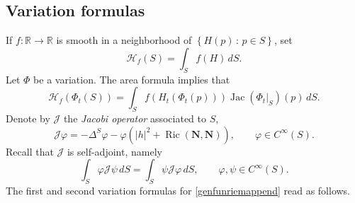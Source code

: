 \documentclass[11pt]{amsart}
\newcommand{\n}[1]{\nabla^\varepsilon_{ #1 }}
\newcommand{\tmc}{{\mathscr{H}}}
\newcommand{\rr}{{\mathbb{R}}}
\newcommand{\X}{\mathbf{X}}
\newcommand{\Z}{\mathbf{Z}}
\renewcommand{\n}{\mathbf{N}}
\DeclareMathOperator{\ric}{Ric}
\newcommand{\jacobi}{\mathcal{J}}
\DeclareMathOperator{\jac}{Jac}
\theoremstyle{definition}
\theoremstyle{remark}
\numberwithin{equation}{section}
\begin{document}
\subsection{Variation formulas}
 If 
$f:\rr\to\rr$ is smooth in a neighborhood of $\left\{H(p)\,:\,p\in S\right\}$, set
\begin{equation}\label{genfunriemappend}
    \tmc_f(S)=\int_S f(H)\,dS.
\end{equation}
Let $\Phi$ be a variation. The area formula implies that 
\begin{equation}\label{areaformulaapplicata}
     \tmc_f\left(\Phi_t(S)\right)=\int_S f\left(H_t\left(\Phi_t(p)\right)\right)\jac\left(\Phi_t|_{S}\right)\left(p\right)\,dS.
\end{equation}
Denote by $\jacobi$ the \emph{Jacobi operator} associated to $S$, 
\begin{equation}\label{def_jacobi_operator}
    \jacobi \varphi=-\Delta^S\varphi-\varphi\left(|h|^2+\ric(\n,\n)\right),\qquad\varphi\in C^\infty(S).
\end{equation}
Recall that $\jacobi$ is self-adjoint, namely
\begin{equation}\label{jacobiselfadjoint}
    \int_S\varphi\jacobi\psi\,dS=\int_S\psi\jacobi\varphi\,dS,\qquad\varphi,\psi\in C^\infty(S).
\end{equation}
The first and second variation formulas for \eqref{genfunriemappend} read as follows.
\end{document}
